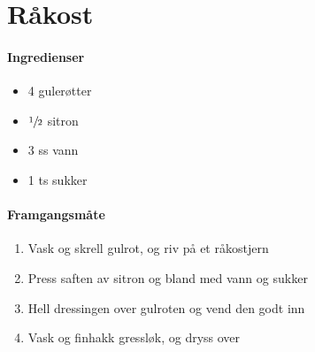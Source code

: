 \section{Råkost}


\paragraph{Ingredienser}
\begin{itemize}[noitemsep]
	\item 4 gulerøtter
	\item $\sfrac{1}{2}$  sitron
	\item 3 ss vann
	\item 1 ts sukker
\end{itemize}

\paragraph{Framgangsmåte}
\begin{enumerate}[noitemsep]
	\item Vask og skrell gulrot, og riv på et råkostjern
	\item Press saften av sitron og bland med vann og sukker
	\item Hell dressingen over gulroten og vend den godt inn
	\item Vask og finhakk gressløk, og dryss over
\end{enumerate}
